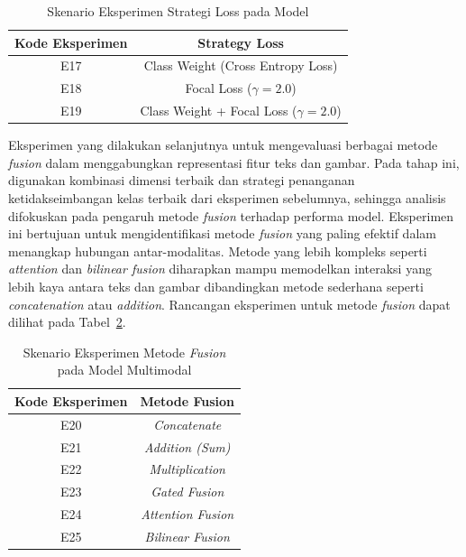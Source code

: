 \begin{table}[H]
    \centering
    \caption{Skenario Eksperimen Strategi Loss pada Model}
    \label{tabel:strategi_penanganan_imbalance_multimodal}
    \small
    \setlength{\tabcolsep}{8pt}
    \renewcommand{\arraystretch}{1.1}
    \begin{tabular}{c c}
        \hline
        \textbf{Kode Eksperimen} & \textbf{Strategy Loss} \\
        \hline
        E17 & Class Weight (Cross Entropy Loss) \\
        E18 & Focal Loss ($\gamma = 2.0$) \\
        E19 & Class Weight + Focal Loss ($\gamma = 2.0$) \\
        \hline
    \end{tabular}
\end{table}

Eksperimen yang dilakukan selanjutnya untuk mengevaluasi berbagai metode \textit{fusion} dalam menggabungkan representasi fitur teks dan gambar. Pada tahap ini, digunakan kombinasi dimensi terbaik dan strategi penanganan ketidakseimbangan kelas terbaik dari eksperimen sebelumnya, sehingga analisis difokuskan pada pengaruh metode \textit{fusion} terhadap performa model. Eksperimen ini bertujuan untuk mengidentifikasi metode \textit{fusion} yang paling efektif dalam menangkap hubungan antar-modalitas. Metode yang lebih kompleks seperti \textit{attention} dan \textit{bilinear fusion} diharapkan mampu memodelkan interaksi yang lebih kaya antara teks dan gambar dibandingkan metode sederhana seperti \textit{concatenation} atau \textit{addition}. Rancangan eksperimen untuk metode \textit{fusion} dapat dilihat pada Tabel~\ref{tabel:metode_fusion_multimodal}.
\begin{table}[H]
    \centering
    \caption{Skenario Eksperimen Metode \textit{Fusion} pada Model Multimodal}
    \label{tabel:metode_fusion_multimodal}
    \small
    \setlength{\tabcolsep}{8pt}
    \renewcommand{\arraystretch}{1.1}
    \begin{tabular}{c c}
        \hline
        \textbf{Kode Eksperimen} & \textbf{Metode Fusion} \\
        \hline
        E20 & \textit{Concatenate} \\
        E21 & \textit{Addition (Sum)} \\
        E22 & \textit{Multiplication} \\
        E23 & \textit{Gated Fusion} \\
        E24 & \textit{Attention Fusion} \\
        E25 & \textit{Bilinear Fusion} \\
        \hline
    \end{tabular}
\end{table}

